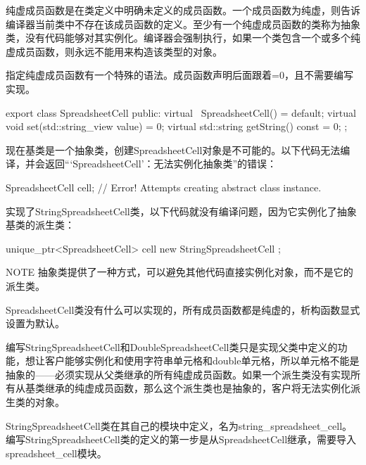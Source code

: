 
纯虚成员函数是在类定义中明确未定义的成员函数。一个成员函数为纯虚，则告诉编译器当前类中不存在该成员函数的定义。至少有一个纯虚成员函数的类称为抽象类，没有代码能够对其实例化。编译器会强制执行，如果一个类包含一个或多个纯虚成员函数，则永远不能用来构造该类型的对象。

指定纯虚成员函数有一个特殊的语法。成员函数声明后面跟着=0，且不需要编写实现。

\begin{cpp}
export class SpreadsheetCell
{
    public:
        virtual ~SpreadsheetCell() = default;
        virtual void set(std::string_view value) = 0;
        virtual std::string getString() const = 0;
};
\end{cpp}

现在基类是一个抽象类，创建SpreadsheetCell对象是不可能的。以下代码无法编译，并会返回“‘SpreadsheetCell’：无法实例化抽象类”的错误：

\begin{cpp}
SpreadsheetCell cell; // Error! Attempts creating abstract class instance.
\end{cpp}

实现了StringSpreadsheetCell类，以下代码就没有编译问题，因为它实例化了抽象基类的派生类：

\begin{cpp}
unique_ptr<SpreadsheetCell> cell { new StringSpreadsheetCell {} };
\end{cpp}

\begin{myNotic}{NOTE}
抽象类提供了一种方式，可以避免其他代码直接实例化对象，而不是它的派生类。
\end{myNotic}

SpreadsheetCell类没有什么可以实现的，所有成员函数都是纯虚的，析构函数显式设置为默认。


编写StringSpreadsheetCell和DoubleSpreadsheetCell类只是实现父类中定义的功能，想让客户能够实例化和使用字符串单元格和double单元格，所以单元格不能是抽象的——必须实现从父类继承的所有纯虚成员函数。如果一个派生类没有实现所有从基类继承的纯虚成员函数，那么这个派生类也是抽象的，客户将无法实例化派生类的对象。


StringSpreadsheetCell类在其自己的模块中定义，名为string\_spreadsheet\_cell。编写StringSpreadsheetCell类的定义的第一步是从SpreadsheetCell继承，需要导入spreadsheet\_cell模块。

